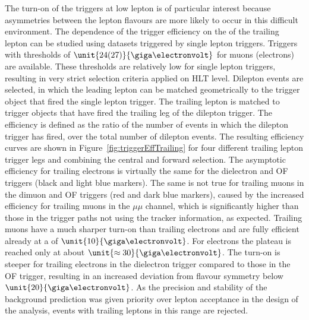 The turn-on of the triggers at low lepton \pt is of particular interest because asymmetries between the lepton flavours are more likely to occur in this difficult environment. The dependence of the trigger efficiency on the \pt of the trailing lepton can be studied using datasets triggered by single lepton triggers. Triggers with \pt thresholds of $\unit{24 (27)}{\giga\electronvolt}$ for muons (electrons) are available. These thresholds are relatively low for single lepton triggers, resulting in very strict selection criteria applied on HLT level. Dilepton events are selected, in which the leading lepton can be matched  geometrically to the trigger object that fired the single lepton trigger. The trailing lepton is matched to trigger objects that have fired the trailing leg of the dilepton trigger. The efficiency is defined as the ratio of the number of events in which the dilepton trigger has fired, over the total number of dilepton events. The resulting efficiency curves are shown in Figure~\ref{fig:triggerEffTrailing} for four different trailing lepton trigger legs and combining the central and forward selection. The asymptotic efficiency for trailing electrons is virtually the same for the dielectron and OF triggers (black and light blue markers). The same is not true for trailing muons in the dimuon and OF triggers (red and dark blue markers), caused by the increased efficiency for trailing muons in the $\mu\mu$ channel, which is significantly higher than those in the trigger paths not using the tracker information, as expected. Trailing muons have a much sharper turn-on than trailing electrons and are fully efficient already at a \pt of $\unit{10}{\giga\electronvolt}$. For electrons the plateau is reached only at about $\unit{\approx 30}{\giga\electronvolt}$. The turn-on is steeper for trailing electrons in the dielectron trigger compared to those in the OF trigger, resulting in an increased deviation from flavour symmetry below $\unit{20}{\giga\electronvolt}$. As the precision and stability of the background prediction was given priority over lepton acceptance in the design of the analysis, events with trailing leptons in this \pt range are rejected.  
